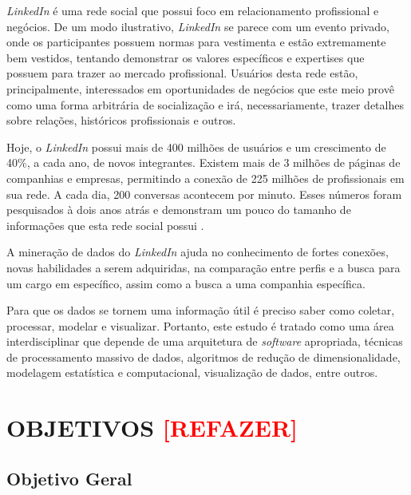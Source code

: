 \textit{LinkedIn} é uma rede social que possui foco em relacionamento profissional e negócios. De um modo ilustrativo, \textit{LinkedIn} se parece com um evento privado, onde os participantes possuem normas para vestimenta e estão extremamente bem vestidos, tentando demonstrar os valores específicos e expertises que possuem para trazer ao mercado profissional. Usuários desta rede estão, principalmente, interessados em oportunidades de negócios que este meio provê como uma forma arbitrária de socialização e irá, necessariamente, trazer detalhes sobre relações, históricos profissionais e outros.

Hoje, o \textit{LinkedIn} possui mais de 400 milhões de usuários e um crescimento de 40\%, a cada ano, de novos integrantes. Existem mais de 3 milhões de páginas de companhias e empresas, permitindo a conexão de 225 milhões de profissionais em sua rede. A cada dia, 200 conversas acontecem por minuto. Esses números foram pesquisados à dois anos atrás e demonstram um pouco do tamanho de informações que esta rede social possui \cite{linkedin-about}.

A mineração de dados do \textit{LinkedIn} ajuda no conhecimento de fortes conexões, novas habilidades a serem adquiridas, na comparação entre perfis e a busca para um cargo em específico, assim como a busca a uma companhia específica.

Para que os dados se tornem uma informação útil é preciso saber como coletar, processar, modelar e visualizar. Portanto, este estudo é tratado como uma área interdisciplinar que depende de uma arquitetura de \textit{software} apropriada, técnicas de processamento massivo de dados, algoritmos de redução de dimensionalidade, modelagem estatística e computacional, visualização de dados, entre outros.


\section{OBJETIVOS \textbf{\textcolor{red}{[REFAZER]}}}\label{sec:objetivos}

\subsection{Objetivo Geral} 

%
